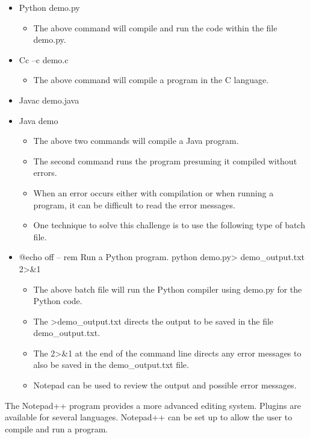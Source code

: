 \documentclass[11.5pt]{sig-alternate}
\begin{document}
\begin{large}
\begin{itemize}
    \item Python demo.py
    \begin{itemize}
        \item The above command will compile and run the code within the file demo.py.
    \end{itemize}
    \item Cc –c demo.c
    \begin{itemize}
        \item The above command will compile a program in the C language.
    \end{itemize}
    \item Javac demo.java
    \item Java demo
    \begin{itemize}
        \item The above two commands will compile a Java program. 
        \item The second command runs the program presuming it compiled without errors.
        \item When an error occurs either with compilation or when running a program, it can be difficult to read the error messages.
        \item One technique to solve this challenge is to use the following type of batch file.
    \end{itemize}
    \item @echo off -- rem Run a Python program. python demo.py> demo\_output.txt 2>\&1
    \begin{itemize}
        \item The above batch file will run the Python compiler using demo.py for the Python code.
        \item The >demo\_output.txt directs the output to be saved in the file demo\_output.txt.
        \item The 2>\&1 at the end of the command line directs any error messages to also be saved in the demo\_output.txt file.
        \item Notepad can be used to review the output and possible error messages.
    \end{itemize}
\end{itemize}

The Notepad++ program provides a more advanced editing system. Plugins are available for several languages. Notepad++ can be set up to allow the user to compile and run a program.
\raggedbottom
\\

\end{large}
\end{document}
